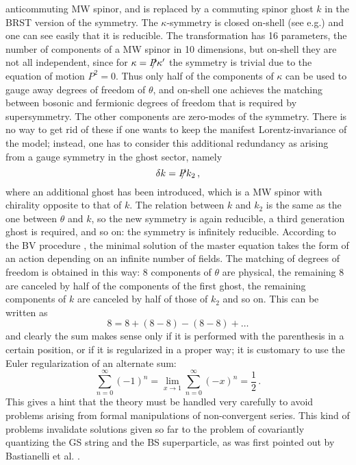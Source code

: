 \documentclass[a4paper,12pt]{article}
\begin{document}
anticommuting MW spinor, and is replaced by a commuting spinor ghost
$k$ in the BRST version of the symmetry.  The $\kappa$-symmetry is
closed on-shell (see e.g.\cite{green3}) and one can see easily that it
is reducible. The transformation has 16 parameters, the number of
components of a MW spinor in 10 dimensions, but on-shell they are not
all independent, since for $\kappa = \SL{P} \kappa'$ the symmetry is
trivial due to the equation of motion $P^2=0$. Thus only half of the
components of $\kappa$ can be used to gauge away degrees of freedom of
$\theta$, and on-shell one achieves the matching between bosonic and
fermionic degrees of freedom that is required by supersymmetry. The
other components are zero-modes of the symmetry.  There is no way to
get rid of these if one wants to keep the manifest Lorentz-invariance
of the model; instead, one has to consider this additional redundancy
as arising from a gauge symmetry in the ghost sector, namely
\begin{equation}
  \delta k = \SL{P} k_2 \, ,
\end{equation}
where an additional ghost has been introduced, which is a
MW spinor with chirality opposite to that of $k$.
The relation between $k$ and $k_2$ is the same as the one between
$\theta$ and $k$, so the new symmetry is again reducible, a third 
generation ghost is required, and so on: the symmetry is infinitely
reducible. 
According to the BV procedure \cite{BV}, the minimal solution of 
the master equation takes the form of an action depending on an
infinite number of fields. The matching of degrees of freedom is
obtained in this way: 8 components of $\theta$ are physical, the
remaining 8 are canceled by half of the components of the first ghost, 
the remaining components of $k$ are canceled by half of those of $k_2$ 
and so on. This can be written as
\begin{displaymath}
  8 = 8 + (8-8) - (8 - 8) + \ldots
\end{displaymath}
and clearly the sum makes sense only if it is performed with the
parenthesis in a certain position, or if it is regularized in a proper
way; it is customary to use the Euler regularization of an alternate
sum:
\begin{equation}
  \sum_{n=0}^\infty (-1)^n = \lim_{x\to 1} \sum_{n=0}^\infty (-x)^n =
  \frac{1}{2} \, .
\end{equation}
This gives a hint that the theory must be handled very 
carefully to avoid problems arising from formal manipulations of
non-convergent series. This kind of problems invalidate 
solutions given so far to the problem of covariantly quantizing the GS
string and the BS superparticle, as was first pointed out by Bastianelli 
et al. \cite{Bastianelli}.
\end{document}
